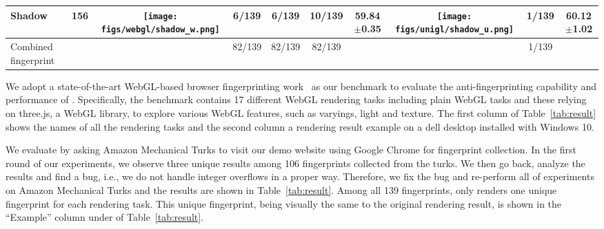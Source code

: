 \begin{table*}[t]
\begin{tabular}{lccccccccc}
\footnotesize Shadow & \footnotesize 156 & \texttt{[image: figs/webgl/shadow\_w.png]} & \footnotesize 6/139& \footnotesize 6/139& \footnotesize 10/139 & \footnotesize 59.84$\pm$0.35  & \texttt{[image: figs/unigl/shadow\_u.png]} & \footnotesize 1/139 & \footnotesize 60.12$\pm$1.02\\
\midrule
\footnotesize Combined fingerprint & & & \footnotesize 82/139& \footnotesize 82/139& \footnotesize 82/139 &  & & \footnotesize 1/139 & \\
\bottomrule
\end{tabular}
\end{table*}

We adopt a state-of-the-art WebGL-based browser fingerprinting work~\cite{ndss17cao} as our benchmark to evaluate the anti-fingerprinting capability and performance of \sys.   Specifically, the benchmark contains 17 different WebGL rendering tasks including plain WebGL tasks and these relying on three.js, a WebGL library, to explore various WebGL features, such as varyings, light and texture.   The first column of Table~\ref{tab:result} shows the names of all the rendering tasks and the second column a rendering result example on a dell desktop installed with Windows 10. %



We evaluate \sys by asking Amazon Mechanical Turks to visit our demo website using Google Chrome for fingerprint collection. %
 In the first round of our experiments, we observe three unique results among 106 fingerprints collected from the turks.  We then go back, analyze the results and find a bug, i.e., we do not handle integer overflows in a proper way.  Therefore, we fix the bug and re-perform all of experiments on Amazon Mechanical Turks and the results are shown in Table~\ref{tab:result}.  Among all 139 fingerprints, \sys only renders one unique fingerprint for each rendering task.  This unique fingerprint, being visually the same to the original rendering result, is shown in the ``Example'' column under \sys of Table~\ref{tab:result}.
 
